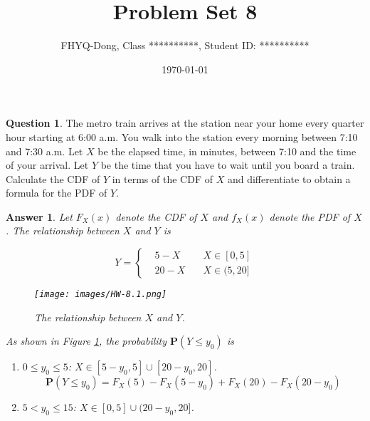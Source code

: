 \documentclass[utf8]{article}
\title{Problem Set 8}
\author{ FHYQ-Dong, Class **********, Student ID: ********** }
\date{\today}
\theoremstyle{definition}%
\newtheorem{question}{Question} %
\theoremstyle{plain}%
\newtheorem{answer}{Answer} %
\begin{document}
\maketitle
\thispagestyle{fancy}

\begin{question}
    The metro train arrives at the station near your home every quarter hour starting at 6:00 a.m. You walk into the station every morning between 7:10 and 7:30 a.m. Let $X$ be the elapsed time, in minutes, between 7:10 and the time of your arrival. Let $Y$ be the time that you have to wait until you board a train. Calculate the CDF of $Y$ in terms of the CDF of $X$ and differentiate to obtain a formula for the PDF of $Y$.
\end{question}
\begin{answer}
    Let $F_{X}(x)$ denote the CDF of $X$ and $f_{X}(x)$ denote the PDF of $X$. The relationship between $X$ and $Y$ is 
    \begin{figure}[H]
        \centering
        \begin{minipage}[c]{0.45\textwidth}
            \begin{equation}
                Y = \left\{\begin{aligned}
                    &5 - X \quad &X \in [0, 5] \\
                    &20 - X \quad &X \in (5, 20] 
                \end{aligned}\right.
            \end{equation}
        \end{minipage}
        \hfill
        \begin{minipage}[c]{0.45\textwidth}
            \centering
            \texttt{[image: images/HW-8.1.png]}
            \vspace{-1.5em}
            \caption{\textit{The relationship between $X$ and $Y$.}}
            \label{fig:HW-8.1}
        \end{minipage}
    \end{figure}
    As shown in Figure \ref{fig:HW-8.1}, the probability $\mathbf{P}(Y \leq y_0)$ is
    \begin{enumerate}[label=(\alph*)]
        \item $0 \leq y_0 \leq 5$: $X \in [5-y_0, 5] \cup [20-y_0, 20]$.
            \begin{equation}
                \mathbf{P}(Y \leq y_0) = F_{X}(5) - F_{X}(5-y_0) + F_{X}(20) - F_{X}(20-y_0)
            \end{equation}
        \item $5 < y_0 \leq 15$: $X \in [0, 5] \cup (20-y_0, 20]$.

\end{enumerate}
\end{answer}
\end{document}
